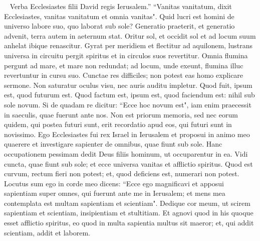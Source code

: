 
\begin{biblechapter}   
\verse Verba Ecclesiastes filii David regis Ierusalem.” 
\verse “Vanitas vanitatum, dixit Ecclesiastes, vanitas vanitatum et omnia vanitas". 
\verse Quid lucri est homini de universo labore suo, quo laborat sub sole? 
\verse Generatio praeterit, et generatio advenit, terra autem in aeternum stat. 
\verse Oritur sol, et occidit sol et ad locum suum anhelat ibique renascitur. 
\verse Gyrat per meridiem et flectitur ad aquilonem, lustrans universa in circuitu pergit spiritus et in circulos suos revertitur. 
\verse Omnia flumina pergunt ad mare, et mare non redundat; ad locum, unde exeunt, flumina illuc revertuntur in cursu suo. 
\verse Cunctae res difficiles; non potest eas homo explicare sermone. Non saturatur oculus visu, nec auris auditu impletur. 
\verse Quod fuit, ipsum est, quod futurum est. Quod factum est, ipsum est, quod faciendum est: 
\verse nihil sub sole novum. Si de quadam re dicitur: “Ecce hoc novum est", iam enim praecessit in saeculis, quae fuerunt ante nos. 
\verse Non est priorum memoria, sed nec eorum quidem, qui postea futuri sunt, erit recordatio apud eos, qui futuri sunt in novissimo. 
\verse Ego Ecclesiastes fui rex Israel in Ierusalem 
\verse et proposui in animo meo quaerere et investigare sapienter de omnibus, quae fiunt sub sole. Hanc occupationem pessimam dedit Deus filiis hominum, ut occuparentur in ea. 
\verse Vidi cuncta, quae fiunt sub sole; et ecce universa vanitas et afflictio spiritus. 
\verse Quod est curvum, rectum fieri non potest; et, quod deficiens est, numerari non potest. 
\verse Locutus sum ego in corde meo dicens: “Ecce ego magnificavi et apposui sapientiam super omnes, qui fuerunt ante me in Ierusalem; et mens mea contemplata est multam sapientiam et scientiam". 
\verse Dedique cor meum, ut scirem sapientiam et scientiam, insipientiam et stultitiam. Et agnovi quod in his quoque esset afflictio spiritus, eo quod 
\verse in multa sapientia multus sit maeror; et, qui addit scientiam, addit et laborem. 
\end{biblechapter}

